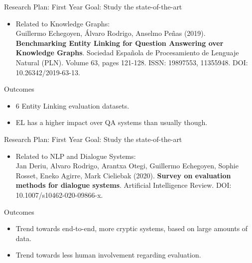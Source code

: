 \documentclass{beamer}
\begin{document}

\begin{frame}{Research Plan: First Year}
  \alert{Goal}: Study the state-of-the-art
  \vspace{0.2cm}
  \begin{itemize}
    \item Related to Knowledge Graphs: \\
      {\small Guillermo Echegoyen, Álvaro Rodrigo, Anselmo Peñas (2019). \textbf{Benchmarking Entity Linking for Question Answering over Knowledge Graphs}. Sociedad Espa\~nola de Procesamiento de Lenguaje Natural (PLN). Volume 63, pages 121-128. ISSN: 19897553, 11355948. DOI: 10.26342/2019-63-13. \cite{Echegoyen2019}}
  \end{itemize}
  \begin{block}{Outcomes}
    \begin{itemize}
      \item 6 Entity Linking evaluation datasets.
      \item EL has a higher impact over QA systems than usually though.
    \end{itemize}
  \end{block}
\end{frame}

\begin{frame}{Research Plan: First Year}
  \alert{Goal}: Study the state-of-the-art
  \vspace{0.2cm}
  \begin{itemize}
    \item Related to NLP and Dialogue Systems: \\
      {\small Jan Deriu, Alvaro Rodrigo, Arantxa Otegi, Guillermo Echegoyen, Sophie Rosset, Eneko Agirre, Mark Cieliebak (2020). \textbf{Survey on evaluation methods for dialogue systems}. Artificial Intelligence Review. DOI: 10.1007/s10462-020-09866-x. \cite{jan_survey_2020}}
  \end{itemize}
  \begin{block}{Outcomes}
    \begin{itemize}
      \item Trend towards end-to-end, more cryptic systems, based on large amounts of data.
      \item Trend towards less human involvement regarding evaluation. 
    \end{itemize}
  \end{block}
\end{frame}
\end{document}
